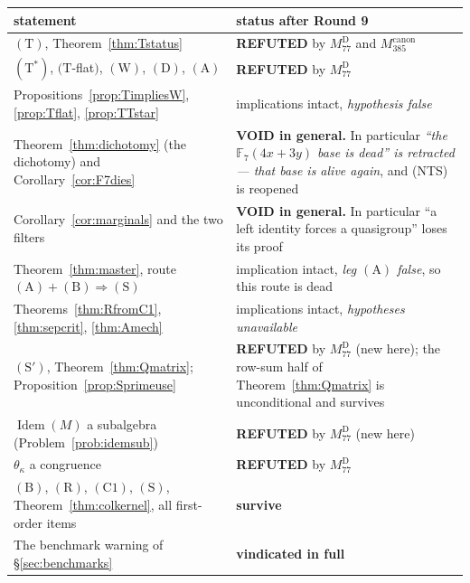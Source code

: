 \documentclass[11pt]{article}
\theoremstyle{plain}
\theoremstyle{definition}
\theoremstyle{remark}
\numberwithin{equation}{section}
\newcommand{\F}{\mathbb{F}}
\newcommand{\Idem}{\operatorname{Idem}}
\begin{document}
\begin{center}
{\footnotesize
\begin{tabular}{p{}p{}}
\toprule
statement & status after Round 9\\
\midrule
$(\mathrm{T})$, Theorem~\ref{thm:Tstatus} & \textbf{REFUTED} by
$M_{77}^{\mathrm{D}}$ and $M_{385}^{\mathrm{canon}}$\\
$(\mathrm{T}^{*})$, $(\mathrm{T}$-flat$)$, $(\mathrm{W})$, $(\mathrm{D})$,
$(\mathrm{A})$ & \textbf{REFUTED} by $M_{77}^{\mathrm{D}}$\\
Propositions~\ref{prop:TimpliesW}, \ref{prop:Tflat}, \ref{prop:TTstar} &
implications intact, \emph{hypothesis false}\\
Theorem~\ref{thm:dichotomy} (the dichotomy) and
Corollary~\ref{cor:F7dies} & \textbf{VOID in general.} In particular
\emph{``the $\F_7(4x+3y)$ base is dead'' is retracted --- that base is alive
again}, and (NTS) is reopened\\
Corollary~\ref{cor:marginals} and the two filters & \textbf{VOID in general.} In
particular ``a left identity forces a quasigroup'' loses its proof\\
Theorem~\ref{thm:master}, route $(\mathrm{A})+(\mathrm{B})\Rightarrow(\mathrm{S})$
& implication intact, \emph{leg $(\mathrm{A})$ false}, so this route is dead\\
Theorems~\ref{thm:RfromC1}, \ref{thm:sepcrit}, \ref{thm:Amech} &
implications intact, \emph{hypotheses unavailable}\\
$(\mathrm{S}')$, Theorem~\ref{thm:Qmatrix}; Proposition~\ref{prop:Sprimeuse} &
\textbf{REFUTED} by $M_{77}^{\mathrm{D}}$ (new here); the row-sum half of
Theorem~\ref{thm:Qmatrix} is unconditional and survives\\
$\Idem(M)$ a subalgebra (Problem~\ref{prob:idemsub}) &
\textbf{REFUTED} by $M_{77}^{\mathrm{D}}$ (new here)\\
$\theta_\kappa$ a congruence & \textbf{REFUTED} by $M_{77}^{\mathrm{D}}$\\
$(\mathrm{B})$, $(\mathrm{R})$, $(\mathrm{C1})$, $(\mathrm{S})$,
Theorem~\ref{thm:colkernel}, all first-order items & \textbf{survive}\\
The benchmark warning of \S\ref{sec:benchmarks} & \textbf{vindicated in full}\\
\bottomrule
\end{tabular}}
\end{center}
\end{document}
